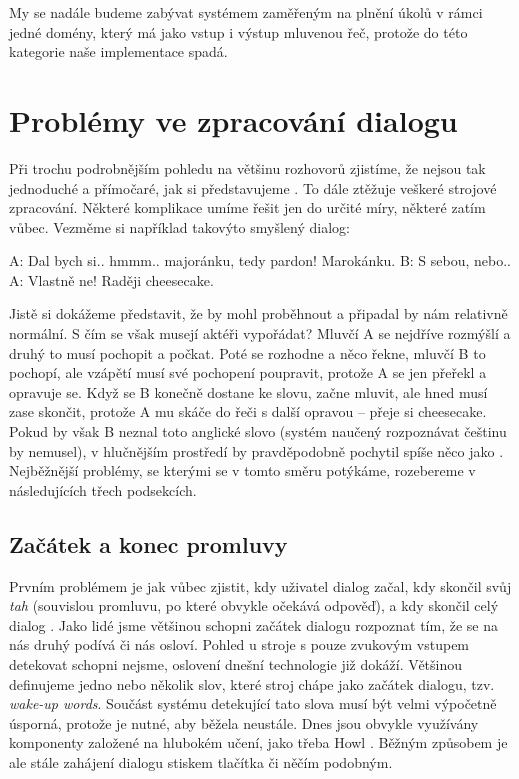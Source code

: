 My se nadále budeme zabývat systémem zaměřeným na plnění úkolů v rámci jedné
domény, který má jako vstup i výstup mluvenou řeč, protože do této kategorie
naše implementace spadá.

\section{Problémy ve zpracování dialogu}

Při trochu podrobnějším pohledu na většinu rozhovorů zjistíme, že nejsou
tak jednoduché a přímočaré, jak si představujeme \citep[sekce 24.1]{jurafsky_slp_2020}. To dále ztěžuje
veškeré strojové zpracování. Některé komplikace umíme řešit jen do určité
míry, některé zatím vůbec. Vezměme si například takovýto smyšlený dialog:

\begin{code}
    A: Dal bych si.. hmmm.. majoránku, tedy pardon! Marokánku.
    B: S sebou, nebo..
    A: Vlastně ne! Raději cheesecake.
\end{code}

Jistě si dokážeme představit, že by mohl proběhnout a připadal by nám
relativně normální. S čím se však musejí aktéři vypořádat? Mluvčí A se
nejdříve rozmýšlí a druhý to musí pochopit a počkat. Poté se rozhodne
a něco řekne, mluvčí B to pochopí, ale vzápětí musí své pochopení
poupravit, protože A se jen přeřekl a opravuje se. Když se B konečně
dostane ke slovu, začne mluvit, ale hned musí zase skončit, protože
A mu skáče do řeči s další opravou -- přeje si cheesecake. Pokud by
však B neznal toto anglické slovo (systém naučený rozpoznávat češtinu
by nemusel), v hlučnějším prostředí by pravděpodobně pochytil spíše
něco jako . Nejběžnější problémy, se kterými se v tomto
směru potýkáme, rozebereme v následujících třech podsekcích.

\subsection{Začátek a konec promluvy}

Prvním problémem je jak vůbec zjistit, kdy uživatel dialog začal, kdy
skončil svůj \textit{tah} (souvislou promluvu, po které obvykle očekává odpověď),
a kdy skončil celý dialog \citep[strana 494]{jurafsky_slp_2020}.
Jako lidé jsme většinou schopni začátek dialogu rozpoznat tím, že se na
nás druhý podívá či nás osloví. Pohled u stroje s pouze zvukovým vstupem
detekovat schopni nejsme, oslovení dnešní technologie již dokáží. Většinou
definujeme jedno nebo několik slov, které stroj chápe jako začátek dialogu,
tzv. \textit{wake-up words}. Součást systému detekující tato slova musí být velmi
výpočetně úsporná, protože je nutné, aby běžela neustále. Dnes jsou obvykle
využívány komponenty založené na hlubokém učení, jako třeba Howl
\citep{tang_howl_2020}.
Běžným způsobem je ale stále zahájení dialogu stiskem tlačítka či něčím
podobným.

